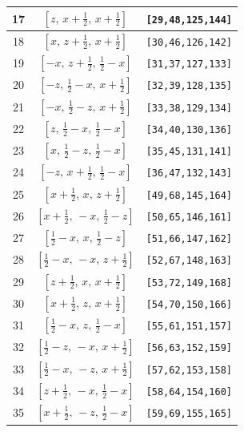 \documentclass[fleqn,8pt]{jsarticle}
\begin{document}
\begin{longtable}{ccc}
17 & $\left[ z,\, x + \frac{1}{2},\, x + \frac{1}{2} \right]$ & {\tt [29,48,125,144]} \\ \hline
18 & $\left[ x,\, z + \frac{1}{2},\, x + \frac{1}{2} \right]$ & {\tt [30,46,126,142]} \\ \hline
19 & $\left[ - x,\, z + \frac{1}{2},\, \frac{1}{2} - x \right]$ & {\tt [31,37,127,133]} \\ \hline
20 & $\left[ - z,\, \frac{1}{2} - x,\, x + \frac{1}{2} \right]$ & {\tt [32,39,128,135]} \\ \hline
21 & $\left[ - x,\, \frac{1}{2} - z,\, x + \frac{1}{2} \right]$ & {\tt [33,38,129,134]} \\ \hline
22 & $\left[ z,\, \frac{1}{2} - x,\, \frac{1}{2} - x \right]$ & {\tt [34,40,130,136]} \\ \hline
23 & $\left[ x,\, \frac{1}{2} - z,\, \frac{1}{2} - x \right]$ & {\tt [35,45,131,141]} \\ \hline
24 & $\left[ - z,\, x + \frac{1}{2},\, \frac{1}{2} - x \right]$ & {\tt [36,47,132,143]} \\ \hline
25 & $\left[ x + \frac{1}{2},\, x,\, z + \frac{1}{2} \right]$ & {\tt [49,68,145,164]} \\ \hline
26 & $\left[ x + \frac{1}{2},\, - x,\, \frac{1}{2} - z \right]$ & {\tt [50,65,146,161]} \\ \hline
27 & $\left[ \frac{1}{2} - x,\, x,\, \frac{1}{2} - z \right]$ & {\tt [51,66,147,162]} \\ \hline
28 & $\left[ \frac{1}{2} - x,\, - x,\, z + \frac{1}{2} \right]$ & {\tt [52,67,148,163]} \\ \hline
29 & $\left[ z + \frac{1}{2},\, x,\, x + \frac{1}{2} \right]$ & {\tt [53,72,149,168]} \\ \hline
30 & $\left[ x + \frac{1}{2},\, z,\, x + \frac{1}{2} \right]$ & {\tt [54,70,150,166]} \\ \hline
31 & $\left[ \frac{1}{2} - x,\, z,\, \frac{1}{2} - x \right]$ & {\tt [55,61,151,157]} \\ \hline
32 & $\left[ \frac{1}{2} - z,\, - x,\, x + \frac{1}{2} \right]$ & {\tt [56,63,152,159]} \\ \hline
33 & $\left[ \frac{1}{2} - x,\, - z,\, x + \frac{1}{2} \right]$ & {\tt [57,62,153,158]} \\ \hline
34 & $\left[ z + \frac{1}{2},\, - x,\, \frac{1}{2} - x \right]$ & {\tt [58,64,154,160]} \\ \hline
35 & $\left[ x + \frac{1}{2},\, - z,\, \frac{1}{2} - x \right]$ & {\tt [59,69,155,165]} \\ \hline

\end{longtable}
\end{document}
